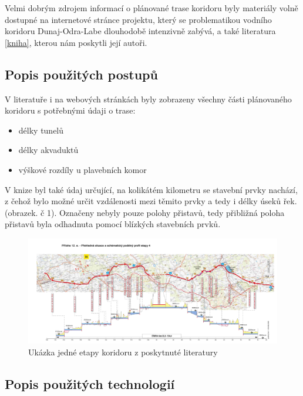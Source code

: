\documentclass[11pt,a4paper]{article}
\begin{document}
    Velmi dobrým zdrojem informací o plánované trase koridoru byly materiály
    volně dostupné na internetové stránce projektu, který se problematikou
    vodního koridoru Dunaj-Odra-Labe dlouhodobě intenzivně zabývá, a také
    literatura \ref{kniha}, kterou nám poskytli její autoři.

    \subsection{Popis použitých postupů}

      V literatuře i na webových stránkách byly zobrazeny všechny části
      plánovaného koridoru s potřebnými údaji o trase:
      \begin{itemize}
        \item délky tunelů
        \item délky akvaduktů
        \item výškové rozdíly u plavebních komor
      \end{itemize}

      V knize byl také údaj určující, na kolikátém kilometru se stavební prvky
      nachází, z čehož bylo možné určit vzdálenosti mezi těmito prvky a tedy i
      délky úseků řek. (obrazek. č 1).  Označeny nebyly pouze polohy přistavů,
      tedy přibližná poloha přistavů byla odhadnuta pomocí blízkých stavebních
      prvků.

    \begin{figure}[ht!]
      \centering
      \includegraphics[width=1\textwidth, natwidth=6969, natheight=2953]
                      {etapa4.jpg}
      \caption{Ukázka jedné etapy koridoru z poskytnuté literatury
      \label{overflow}}
    \end{figure}

    \subsection{Popis použitých technologií}
\end{document}
